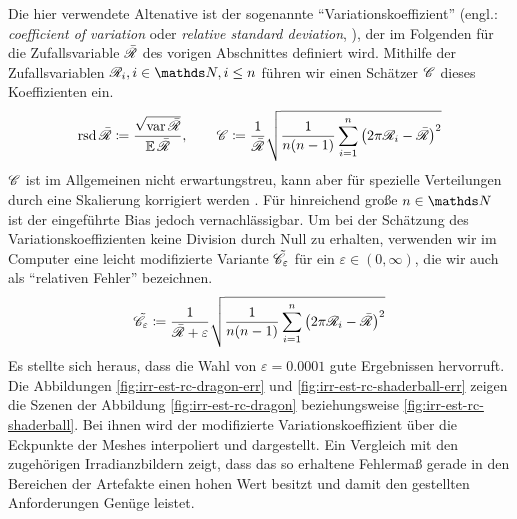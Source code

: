 		Die hier verwendete Altenative ist der sogenannte \enquote{Variationskoeffizient} (engl.: \textit{coefficient of variation} oder \textit{relative standard deviation}, \cite{coeff-of-variation}), der im Folgenden für die Zufallsvariable $\bar{\mathscr{R}}$ des vorigen Abschnittes definiert wird.
		Mithilfe der Zufallsvariablen $\e{R}_i,i\in\SN,i\leq n$ führen wir einen Schätzer $\mathscr{C}$ dieses Koeffizienten ein.
		\[
			\operatorname{rsd} \bar{\mathscr{R}} \coloneqq \frac{\sqrt{\operatorname{var} \bar{\mathscr{R}}}}{\operatorname{\mathbb{E}} \bar{\mathscr{R}}},\qquad \mathscr{C} \coloneqq \frac{1}{ \bar{\mathscr{R}} } \sqrt{\frac{1}{n(n-1)}\sum_{i=1}^n \left( 2\pi\mathscr{R}_i - \bar{\mathscr{R}} \right)^2}
		\]
		$\mathscr{C}$ ist im Allgemeinen nicht erwartungstreu, kann aber für spezielle Verteilungen durch eine Skalierung korrigiert werden \cite{coeff-of-variation}.
		Für hinreichend große $n\in\SN$ ist der eingeführte Bias jedoch vernachlässigbar.
		Um bei der Schätzung des Variationskoeffizienten keine Division durch Null zu erhalten, verwenden wir im Computer eine leicht modifizierte Variante $\tilde{\mathscr{C}}_\varepsilon$ für ein $\varepsilon\in(0,\infty)$, die wir auch als \enquote{relativen Fehler} bezeichnen.
		\[
			\tilde{\mathscr{C}}_\varepsilon \coloneqq \frac{1}{ \bar{\mathscr{R}} + \varepsilon } \sqrt{\frac{1}{n(n-1)}\sum_{i=1}^n \left( 2\pi\mathscr{R}_i - \bar{\mathscr{R}} \right)^2}
		\]
		Es stellte sich heraus, dass die Wahl von $\varepsilon = 0.0001$ gute Ergebnissen hervorruft.
		Die Abbildungen \ref{fig:irr-est-rc-dragon-err} und \ref{fig:irr-est-rc-shaderball-err} zeigen die Szenen der Abbildung \ref{fig:irr-est-rc-dragon} beziehungsweise \ref{fig:irr-est-rc-shaderball}.
		Bei ihnen wird der modifizierte Variationskoeffizient über die Eckpunkte der Meshes interpoliert und dargestellt.
		Ein Vergleich mit den zugehörigen Irradianzbildern zeigt, dass das so erhaltene Fehlermaß gerade in den Bereichen der Artefakte einen hohen Wert besitzt und damit den gestellten Anforderungen Genüge leistet.

